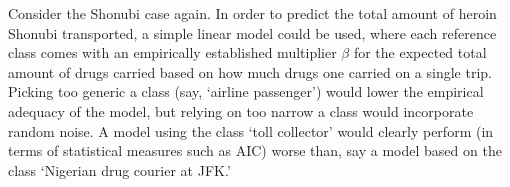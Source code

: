 \documentclass{article}
\begin{document}
%	
Consider the Shonubi case again. In order to predict the total amount of heroin Shonubi transported, a simple linear model could be used, where each reference \textsf{class} comes with an   empirically established multiplier $\beta$ for the expected total amount of drugs carried based on how much drugs one carried on a single trip. Picking too generic a class (say, `airline passenger') would lower the empirical adequacy of the model, but relying on too narrow a class would incorporate random noise. A model using the class `\textsf{toll collector}' would clearly  perform (in terms of statistical measures  such as AIC) worse than, say a model based on the class `\textsf{Nigerian drug courier at JFK}.' 



	
	
\end{document}
